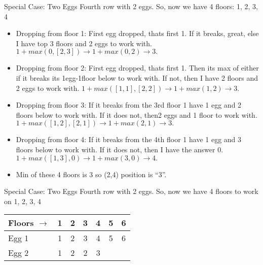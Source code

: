    \begin{frame}[fragile]{Special Case: Two Eggs}
Fourth row with 2 eggs. So, now we have 4 floors: 1, 2, 3, 4
\begin{itemize}
\item Dropping from floor 1: First egg dropped, thats first 1. If it breaks, great, else I have top 3 floors and 2 eggs to work with. $ 1 + max (0,[2,3]) \rightarrow 1 + max (0,2) \rightarrow 3.$
\item Dropping from floor 2: First egg dropped, thats first 1. Then its max of either if it breaks its 1egg-1floor below to work with. If not, then I have 2 floors and 2 eggs to work with. $ 1 + max ([1,1],[2,2]) \rightarrow 1 + max (1,2) \rightarrow 3$.
\item Dropping from floor 3: If it breaks from the 3rd floor 1 have 1 egg and 2 floors below to work with. If it does not, then2 eggs and 1 floor to work with. $ 1 + max ([1,2],[2,1]) \rightarrow 1 + max (2,1) \rightarrow 3.$
\item Dropping from floor 4: If it breaks from the 4th floor 1 have 1 egg and 3 floors below to work with. If it does not, then I have the answer 0. $ 1 + max ([1,3],0) \rightarrow 1 + max (3,0) \rightarrow 4.$
\item Min of these 4 floors is 3 so (2,4) position is ``3''.
\end{itemize}

\end{frame}


   \begin{frame}[fragile]{Special Case: Two Eggs}
Fourth row with 2 eggs. So, now we have 4 floors to work on 1, 2, 3, 4

 \begin{center}
 \begin{tabular}{|l|c|c|c|c|c|c|}
 \hline
Floors $\rightarrow$ & 1 &  2 &   3 &   4 & 5 &  6\\  \hline
Egg 1 & 1 & 2 & 3 & 4 & 5 & 6\\
Egg 2 & 1 & 2 & 2 & 3\\
 \hline
 \end{tabular}
 \end{center}

\end{frame}


